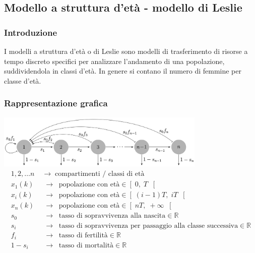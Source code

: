 \newpage

\subsection{Modello a struttura d'età - modello di Leslie}
\subsubsection*{Introduzione}
I modelli a struttura d'età o di Leslie sono modelli di trasferimento di risorse a tempo discreto specifici per analizzare l'andamento
di una popolazione, suddividendola in classi d'età. In genere si contano il numero di femmine per classe d'età.

\subsubsection*{Rappresentazione grafica}
\begin{center}
	\includegraphics[width=0.75\textwidth]{modelli/modello leslie.png}
	\begin{align*}
		1,2, \dots n \;\; &\rightarrow \;\; \text{compartimenti / classi di età} \\
		x_1(k) \;\; &\rightarrow \;\; \text{popolazione con età} \in \left[ \; 0, \;T \; \right[ \\
		x_i(k) \;\; &\rightarrow \;\; \text{popolazione con età} \in \left[ \; (i-1)T, \;iT \; \right[ \\
		x_n(k) \;\; &\rightarrow \;\; \text{popolazione con età} \in \left[ \; nT, \; +\infty \; \right[ \\
		s_0 \;\; &\rightarrow \;\; \text{tasso di sopravvivenza alla nascita} \in \mathbb{R} \\
		s_i \;\; &\rightarrow \;\; \text{tasso di sopravvivenza per passaggio alla classe successiva} \in \mathbb{R} \\
		f_i \;\; &\rightarrow \;\; \text{tasso di fertilità} \in \mathbb{R} \\
		1-s_i \;\; &\rightarrow \;\; \text{tasso di mortalità} \in \mathbb{R}
	\end{align*}
\end{center}

